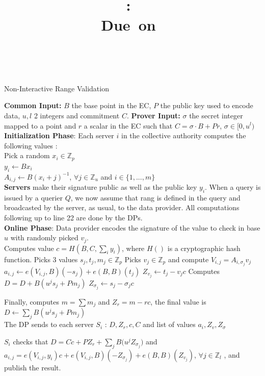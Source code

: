 \documentclass{article}
\title{
\logoepfl
\vspace{2in}
\textmd{\textbf{\hmwkClass:\ \hmwkTitle}}\\
\normalsize\vspace{0.1in}\small{Due\ on\ \hmwkDueDate}\\
\vspace{0.1in}\large{\textit{\hmwkClassInstructor\ \hmwkClassTime}}
\author{\textbf{\hmwkAuthorName}}
\vspace{3in}
}
\begin{document}
\maketitle

\newpage
\begin{algorithm}[H]
\caption{Non-Interactive Range Validation}\label{euclid}
\begin{algorithmic}[1]
\State \textbf{Common Input:} $B$ the base point in the EC, $P$ the public key used to encode data, $u, l$ 2 integers and commitment $C$.
\State \textbf{Prover Input:} $\sigma$ the secret integer mapped to a point and $r$ a scalar in the EC such that $C = \sigma \cdot B + Pr$, $\sigma \in [0,u^l)$\\

\State \textbf{Initialization Phase}: Each server $i$ in the collective authority computes the following values :\\
Pick a random $x_i \in \mathbb{Z}_p$\\
$y_i \gets Bx_i$\\
$A_{i,j} \gets B(x_i + j)^{-1} $, $\forall j \in \mathbb{Z}_u$ and $i \in \{1,...,m\}$\\
\State  \textbf{Servers} make their signature public as well as the public key $y_i$. When a query is issued by a querier $Q$, we now assume that rang is defined in the query and broadcasted by the server, as usual, to the data provider. All computations following up to line 22 are done by the DPs.\\

\State \textbf{Online Phase}: Data provider encodes the signature of the value to check in base $u$ with randomly picked $v_j$.\\

\State Computes value $c = H(B,C,\sum_i{y_i})$, where $H()$ is a cryptographic hash function.
\State Picks 3 values $s_j,t_j,m_j \in \mathbb{Z}_p $
\State Picks $v_j \in \mathbb{Z}_p$ and compute $V_{i,j} = A_{i,\sigma_j}v_j$
\State $a_{i,j} \gets e(V_{i,j},B)(-s_j)+e(B,B)(t_j)$
\State $Z_{v_j} \gets t_j-v_j c$
\EndFor
\State Computes $D = D + B(u^j s_j + Pm_j)$
\State $Z_{\sigma_j} \gets s_j-\sigma_j c$
\EndFor

\State Finally, computes $m=\sum{m_j}$ and $Z_r = m-rc$, the final value is $D \gets \sum_{j}{B(u^j s_j + Pm_j)}$\\
\State The DP sends to each server $S_i$ : $D,Z_r,c,C$ and list of values $a_i,Z_v,Z_{\sigma}$

\State $S_i$ checks that $D = Cc + PZ_r + \sum_{j}{B(u^j Z_{\sigma_j}}) $ and
$a_{i,j} = e(V_{i,j},y_i)c + e(V_{i,j},B)(-Z_{\sigma_j}) + e(B,B)(Z_{v_j})$, $\forall j \in \mathbb{Z}_l$ , and publish the result.\\

\end{algorithmic}
\end{algorithm}
\end{document}
